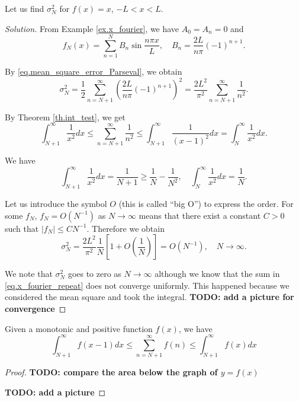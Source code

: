\begin{example}[]
Let us find $\sigma_N^2$ for $f(x)=x$, $-L<x<L$. 
\end{example}
\begin{proof}[Solution]
From Example \ref{ex.x_fourier}, we have $A_0=A_n=0$ and
\begin{equation}\label{eq.x_fourier_repeat}
    f_N(x)=\sum_{n=1}^N B_n \sin \frac{n \pi x}{L}, \quad B_n=\frac{2 L}{n \pi}(-1)^{n+1} .
\end{equation}

By \eqref{eq.mean_square_error_Parseval}, we obtain
$$
\sigma_N^2=\frac{1}{2} \sum_{n=N+1}^{\infty}\left(\frac{2 L}{n \pi}(-1)^{n+1}\right)^2=\frac{2 L^2}{\pi^2} \sum_{n=N+1}^{\infty} \frac{1}{n^2} .
$$

By Theorem \ref{th.int_test}, we get
$$
\int_{N+1}^{\infty} \frac{1}{x^2} d x \leq \sum_{n=N+1}^{\infty} \frac{1}{n^2} \leq \int_{N+1}^{\infty} \frac{1}{(x-1)^2} d x=\int_N^{\infty} \frac{1}{x^2} d x .
$$

We have
$$
\int_{N+1}^{\infty} \frac{1}{x^2} d x=\frac{1}{N+1} \ge \frac{1}{N} - \frac{1}{N^2}, \quad \int_N^{\infty} \frac{1}{x^2} d x=\frac{1}{N} .
$$

Let us introduce the symbol $O$ (this is called ``big O'') to express the order. For some $f_N$, $f_N=O\left(N^{-1}\right)$ as $N \rightarrow \infty$ means that there exist a constant $C>0$ such that $\left|f_N\right| \leq C N^{-1}$. Therefore we obtain
\begin{equation}\label{eq.x_fourier_mse_converge}
    \sigma_N^2=\frac{2 L^2}{\pi^2} \frac{1}{N}\left[1+O\left(\frac{1}{N}\right)\right]=O\left(N^{-1}\right), \quad N \rightarrow \infty .
\end{equation}

We note that $\sigma_N^2$ goes to zero as $N \rightarrow \infty$ although we know that the sum in \eqref{eq.x_fourier_repeat} does not converge uniformly. This happened because we considered the mean square and took the integral. \textbf{TODO: add a picture for convergence}
\end{proof}

\begin{theorem}\label{th.int_test}
    Given a monotonic and positive function $f(x)$, we have 
    \begin{equation}\label{eq.integral_test}
        \int^{\infty}_{N+1} f(x-1) dx \le \sum_{n = N+1}^{\infty} f(n)\le \int^{\infty}_{N+1} f(x) dx
    \end{equation}    
\end{theorem}
\begin{proof}
    \textbf{TODO: compare the area below the graph of $y = f(x)$}

    \textbf{TODO: add a picture}
\end{proof}

